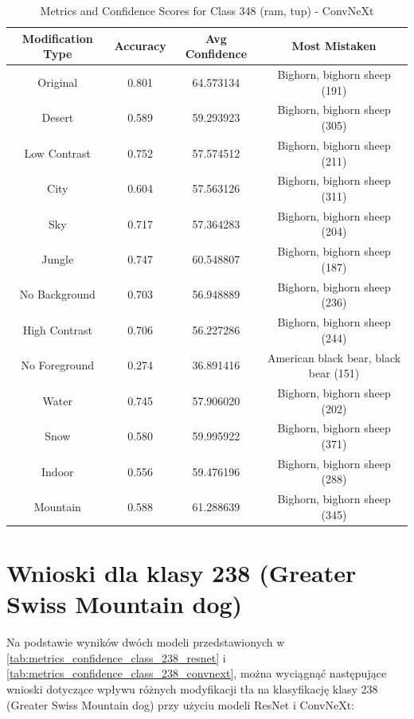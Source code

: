 \begin{table}
	\centering
	\begin{tabular}{|c|c|c|c|}
		\hline
		\textbf{Modification Type} & \textbf{Accuracy} & \textbf{Avg Confidence} & \textbf{Most Mistaken} \\
		\hline
		Original & 0.801 & 64.573134 & Bighorn, bighorn sheep (191) \\
		\hline
		Desert & 0.589 & 59.293923 & Bighorn, bighorn sheep (305) \\
		\hline
		Low Contrast & 0.752 & 57.574512 & Bighorn, bighorn sheep (211) \\
		\hline
		City & 0.604 & 57.563126 & Bighorn, bighorn sheep (311) \\
		\hline
		Sky & 0.717 & 57.364283 & Bighorn, bighorn sheep (204) \\
		\hline
		Jungle & 0.747 & 60.548807 & Bighorn, bighorn sheep (187) \\
		\hline
		No Background & 0.703 & 56.948889 & Bighorn, bighorn sheep (236) \\
		\hline
		High Contrast & 0.706 & 56.227286 & Bighorn, bighorn sheep (244) \\
		\hline
		No Foreground & 0.274 & 36.891416 & American black bear, black bear (151) \\
		\hline
		Water & 0.745 & 57.906020 & Bighorn, bighorn sheep (202) \\
		\hline
		Snow & 0.580 & 59.995922 & Bighorn, bighorn sheep (371) \\
		\hline
		Indoor & 0.556 & 59.476196 & Bighorn, bighorn sheep (288) \\
		\hline
		Mountain & 0.588 & 61.288639 & Bighorn, bighorn sheep (345) \\
		\hline
	\end{tabular}
	\caption{Metrics and Confidence Scores for Class 348 (ram, tup) - ConvNeXt}
	\label{tab:metrics_confidence_class_348_convnext}
\end{table}

\section*{Wnioski dla klasy 238 (Greater Swiss Mountain dog)}

Na podstawie wyników dwóch modeli przedstawionych w \ref*{tab:metrics_confidence_class_238_resnet} i \ref*{tab:metrics_confidence_class_238_convnext}, można wyciągnąć następujące wnioski dotyczące wpływu różnych 
modyfikacji tła na klasyfikację klasy 238 (Greater Swiss Mountain dog) przy użyciu modeli ResNet i ConvNeXt:

